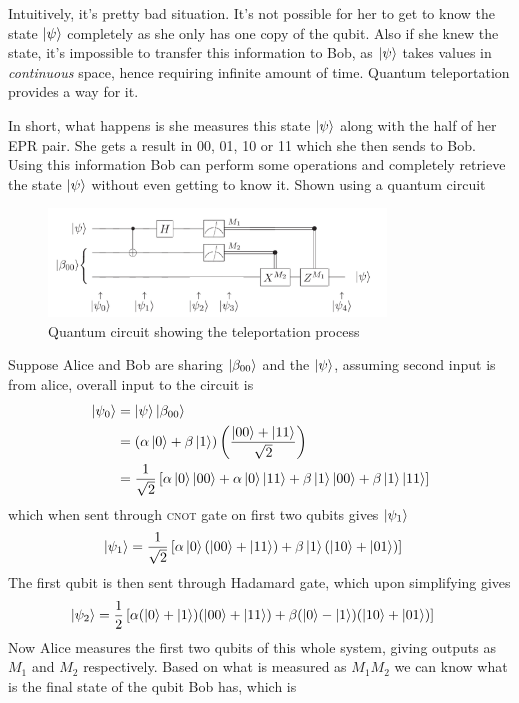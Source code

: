 Intuitively, it's pretty bad situation. It's not possible for her to get to know the state $\ket{\psi}$ completely as she only has one copy of the qubit. Also if she knew the state, it's impossible to transfer this information to Bob, as $\ket{\psi}$ takes values in \textit{continuous} space, hence requiring infinite amount of time. Quantum teleportation provides a way for it. 

In short, what happens is she measures this state $\ket{\psi}$ along with the half of her EPR pair. She gets a result in 00, 01, 10 or 11 which she then sends to Bob. Using this information Bob can perform some operations and completely retrieve the state $\ket{\psi}$ without even getting to know it. Shown using a quantum circuit
\begin{figure}[H]
    \centering
    \includegraphics[width=0.8\textwidth]{images/teleportation.png}
    \caption{Quantum circuit showing the teleportation process}
    \label{fig:teleportation}
\end{figure}
Suppose Alice and Bob are sharing $\ket{\beta_{00}}$ and the $\ket{\psi}$, assuming second input is from alice, overall input to the circuit is 
\begin{align}
    \ket{\psi_0} &= \ket{\psi}\ket{\beta_{00}} \\
    &= (\alpha\ket{0} + \beta\ket{1})\left(\frac{\ket{00} + \ket{11}}{\sqrt{2}}\right)\\
    &= \frac{1}{\sqrt{2}}\left[ \alpha\ket{0}\ket{00} + \alpha\ket{0}\ket{11} + \beta\ket{1}\ket{00} + \beta\ket{1}\ket{11} \right]
\end{align}
which when sent through \textsc{cnot} gate on first two qubits gives $\ket{\psi_1}$
\begin{align}
    \ket{\psi_1} &= \frac{1}{\sqrt{2}}\left[ \alpha\ket{0}(\ket{00}+\ket{11}) + \beta\ket{1}(\ket{10}+\ket{01}) \right]
\end{align}
The first qubit is then sent through Hadamard gate, which upon simplifying gives
\begin{align}
    \ket{\psi_2} &= \frac{1}{2}\left[ \alpha(\ket{0}+\ket{1})(\ket{00}+\ket{11}) + \beta(\ket{0}-\ket{1})(\ket{10}+\ket{01}) \right]
\end{align}
Now Alice measures the first two qubits of this whole system, giving outputs as $M_1$ and $M_2$ respectively. Based on  what is measured as $M_1M_2$ we can know what is the final state of the qubit Bob has, which is
